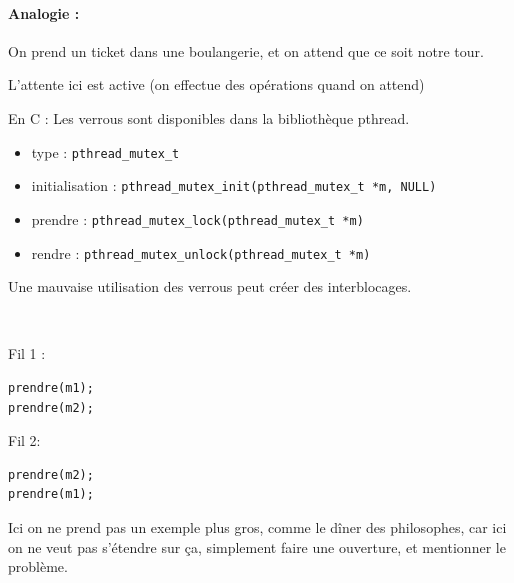 \paragraph{Analogie :} On prend un ticket dans une boulangerie, et on attend que ce soit notre tour.

\begin{rem}
	L'attente ici est active (on effectue des opérations quand on attend)
\end{rem}

\begin{impl}
	\normalfont
	En C : Les verrous sont disponibles dans la bibliothèque pthread. \begin{itemize}[label=]
		\item type : \texttt{pthread\_mutex\_t}
		\item initialisation : \texttt{pthread\_mutex\_init(pthread\_mutex\_t *m, NULL)}
		\item prendre : \texttt{pthread\_mutex\_lock(pthread\_mutex\_t *m)}
		\item rendre : \texttt{pthread\_mutex\_unlock(pthread\_mutex\_t *m)}
	\end{itemize}
\end{impl}

\begin{rem}
	Une mauvaise utilisation des verrous peut créer des interblocages.
\end{rem}

\begin{example} \enspace\\ \normalfont
	\begin{minipage}{0.3\linewidth}
	Fil 1 :
	\begin{lstlisting}[style=CStyle]
prendre(m1);
prendre(m2);\end{lstlisting}
\end{minipage} \quad
\begin{minipage}{0.3\linewidth}
	Fil 2:
	\begin{lstlisting}[style=CStyle]
prendre(m2);
prendre(m1);\end{lstlisting}
\end{minipage}
\end{example}

\begin{com}
	Ici on ne prend pas un exemple plus gros, comme le dîner des philosophes, car ici on ne veut pas s'étendre sur ça, simplement faire une ouverture, et mentionner le problème.
\end{com}

